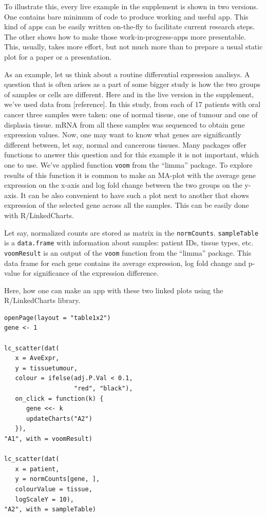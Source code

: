 \documentclass[twocolumn,10pt]{article}
\begin{document}
To illustrate this, every live example in the supplement is shown in two versions. One contains bare minimum of code to produce working and useful app. This kind of apps can be easily written on-the-fly to facilitate current research steps. The other shows how to make those work-in-progress-apps more presentable. This, usually, takes more effort, but not much more than to prepare a usual static plot for a paper or a presentation.

As an example, let us think about a routine differential expression analisys. A question that is often arises as a part of some bigger study is how the two groups of samples or cells are different. Here and in the live version in the supplement, we've used data from [reference]. In this study, from each of 17 patients with oral cancer three samples were taken: one of normal tissue, one of tumour and one of displasia tissue. mRNA from all these samples was sequenced to obtain gene expression values. Now, one may want to know what genes are significantly different between, let say, normal and cancerous tissues. Many packages offer functions to answer this question and for this example it is not important, which one to use. We've applied function \texttt{voom} from the ``limma'' package. To explore results of this function it is common to make an MA-plot with the average gene expression on the x-axis and log fold change between the two groups on the y-axis. It can be also convenient to have such a plot next to another that shows expression of the selected gene across all the samples. This can be easily done with R/LinkedCharts.

Let say, normalized counts are stored as matrix in the \texttt{normCounts}. \texttt{sampleTable} is a \texttt{data.frame} with information about samples: patient IDs, tissue types, etc. \texttt{voomResult} is an output of the \texttt{voom} function from the ``limma'' package. This data frame for each gene contains its average expression, log fold change and p-value for significance of the expression difference.

Here, how one can make an app with these two linked plots using the R/LinkedCharts library.

\begin{verbatim}
openPage(layout = "table1x2")
gene <- 1

lc_scatter(dat(
   x = AveExpr,
   y = tissuetumour,
   colour = ifelse(adj.P.Val < 0.1, 
                   "red", "black"),
   on_click = function(k) { 
      gene <<- k
      updateCharts("A2") 
   }),
"A1", with = voomResult)

lc_scatter(dat(
   x = patient,
   y = normCounts[gene, ],
   colourValue = tissue, 
   logScaleY = 10),
"A2", with = sampleTable)
\end{verbatim}
\end{document}
